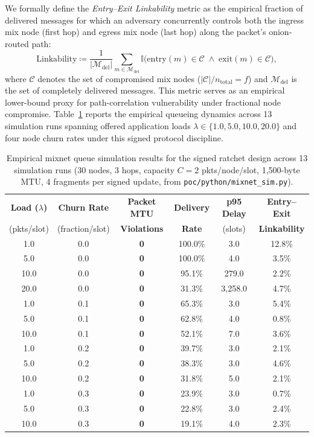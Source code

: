 \documentclass[11pt,a4paper]{article}
\theoremstyle{remark}
\theoremstyle{plain}
\begin{document}
We formally define the \emph{Entry--Exit Linkability} metric as the empirical fraction of delivered messages
for which an adversary concurrently controls both the ingress mix node (first hop) and egress mix node (last hop)
along the packet's onion-routed path:
\[
  \mathrm{Linkability} \coloneqq \frac{1}{|\mathcal{M}_{\mathrm{del}}|} \sum_{m \in \mathcal{M}_{\mathrm{del}}} \mathbb{I}\bigl(\mathrm{entry}(m) \in \mathcal{C} \;\land\; \mathrm{exit}(m) \in \mathcal{C}\bigr),
\]
where $\mathcal{C}$ denotes the set of compromised mix nodes ($|\mathcal{C}| / n_{\mathrm{total}} = f$) and
$\mathcal{M}_{\mathrm{del}}$ is the set of completely delivered messages.  This metric serves as an empirical lower-bound
proxy for path-correlation vulnerability under fractional node compromise.
Table~\ref{tab:mixnet_sim} reports the empirical queueing dynamics
across 13 simulation runs spanning offered application loads $\lambda \in \{1.0, 5.0, 10.0, 20.0\}$ and four node churn rates under this signed protocol discipline.

\begin{table}[ht]
\centering
\small
\caption{Empirical mixnet queue simulation results for the signed ratchet design across 13 simulation runs (30 nodes, 3 hops, capacity $C=2$ pkts/node/slot, 1{,}500-byte MTU, 4 fragments per signed update, from \texttt{poc/python/mixnet\_sim.py}).}
\label{tab:mixnet_sim}
\begin{tabular}{@{}cccccc@{}}
\toprule
\textbf{Load ($\lambda$)} & \textbf{Churn Rate} & \textbf{Packet MTU} & \textbf{Delivery} & \textbf{p95 Delay} & \textbf{Entry--Exit} \\
(pkts/slot)               & (fraction/slot)     & \textbf{Violations}  & \textbf{Rate}     & (slots)            & \textbf{Linkability} \\
\midrule
1.0  & 0.0 & \textbf{0} & 100.0\% & 3.0   & 12.8\% \\
5.0  & 0.0 & \textbf{0} & 100.0\% & 4.0   & 3.5\%  \\
10.0 & 0.0 & \textbf{0} & 95.1\%  & 279.0 & 2.2\%  \\
20.0 & 0.0 & \textbf{0} & 31.3\%  & 3{,}258.0 & 4.7\% \\
\midrule
1.0  & 0.1 & \textbf{0} & 65.3\%  & 3.0   & 5.4\%  \\
5.0  & 0.1 & \textbf{0} & 62.8\%  & 4.0   & 0.8\%  \\
10.0 & 0.1 & \textbf{0} & 52.1\%  & 7.0   & 3.6\%  \\
\midrule
1.0  & 0.2 & \textbf{0} & 39.7\%  & 3.0   & 2.1\%  \\
5.0  & 0.2 & \textbf{0} & 38.3\%  & 3.0   & 4.6\%  \\
10.0 & 0.2 & \textbf{0} & 31.8\%  & 5.0   & 2.1\%  \\
\midrule
1.0  & 0.3 & \textbf{0} & 23.9\%  & 3.0   & 0.7\%  \\
5.0  & 0.3 & \textbf{0} & 22.8\%  & 3.0   & 2.4\%  \\
10.0 & 0.3 & \textbf{0} & 19.1\%  & 4.0   & 2.3\%  \\
\bottomrule
\end{tabular}
\end{table}
\end{document}
